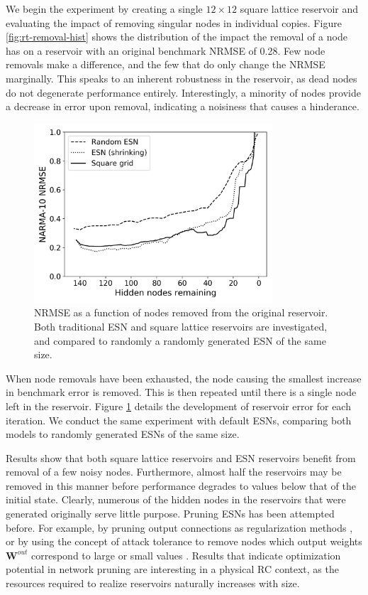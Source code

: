 We begin the experiment by creating a single $12 \times 12$ square lattice
reservoir and evaluating the impact of removing singular nodes in individual
copies. Figure \ref{fig:rt-removal-hist} shows the distribution of the impact
the removal of a node has on a reservoir with an original benchmark NRMSE of
0.28. Few node removals make a difference, and the few that do only change the
NRMSE marginally. This speaks to an inherent robustness in the reservoir, as
dead nodes do not degenerate performance entirely. Interestingly, a minority of
nodes provide a decrease in error upon removal, indicating a noisiness that
causes a hinderance.

\begin{figure}
  \centering
  \includegraphics[width=3.5in]{figures/shrink-performance.png}
  \caption{
    NRMSE as a function of nodes removed from the original reservoir. Both
traditional ESN and square lattice reservoirs are investigated, and compared to
randomly a randomly generated ESN of the same size.
  }
  \label{fig:sq-shrink-performance}
\end{figure}

When node removals have been exhausted, the node causing the smallest increase
in benchmark error is removed. This is then repeated until there is a single
node left in the reservoir. Figure \ref{fig:sq-shrink-performance} details the
development of reservoir error for each iteration. We conduct the same
experiment with default ESNs, comparing both models to randomly generated ESNs
of the same size.

Results show that both square lattice reservoirs and ESN reservoirs benefit from
removal of a few noisy nodes. Furthermore, almost half the reservoirs may be
removed in this manner before performance degrades to values below that of the
initial state. Clearly, numerous of the hidden nodes in the reservoirs that were
generated originally serve little purpose. Pruning ESNs has been attempted
before. For example, by pruning output connections as regularization methods
\cite{dutoit_pruning_2009}, or by using the concept of attack tolerance to
remove nodes which output weights $\mathbf{W}^{out}$ correspond to large or
small values \cite{haluszczynski_reservoir_2020}. Results that indicate
optimization potential in network pruning are interesting in a physical RC
context, as the resources required to realize reservoirs naturally increases
with size.

